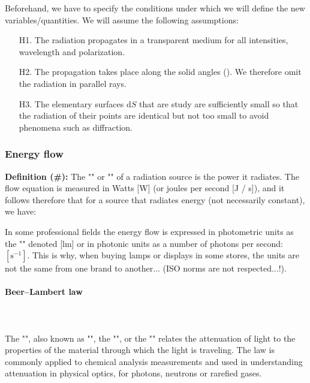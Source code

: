 	Beforehand, we have to specify the conditions under which we will define the new variables/quantities. We will assume the following assumptions:
	\begin{enumerate}
		\item[H1.] The radiation propagates in a transparent medium for all intensities, wavelength and polarization.
		\item[H2.] The propagation takes place along the solid angles (). We therefore omit the radiation in parallel rays.
		
		\item[H3.] The elementary surfaces $\mathrm{d}S$ that are study are sufficiently small so that the radiation of their points are identical but not too small to avoid phenomena such as diffraction.
	\end{enumerate}
	
	\subsubsection{Energy flow} 
	\textbf{Definition (\#\mydef):} The "" or "" of a radiation source is the power it radiates. The flow equation is measured in Watts [W] (or joules per second [J / s]), and it follows therefore that for a source that radiates energy (not necessarily constant), we have:
	
	In some professional fields the energy flow is expressed in photometric units as the "" denoted [lm] or in photonic units as a number of photons per second: $[\text{s}^{-1}]$. This is why, when buying lamps or displays in some stores, the units are not the same from one brand to another... (ISO norms are not respected...!).
	
	\paragraph{Beer–Lambert law}\mbox{}\\\\
	The "", also known as "", the "", or the "" relates the attenuation of light to the properties of the material through which the light is traveling. The law is commonly applied to chemical analysis measurements and used in understanding attenuation in physical optics, for photons, neutrons or rarefied gases.
	
